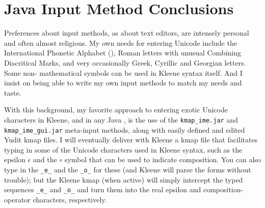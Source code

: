\section{Java Input Method Conclusions}

Preferences about input methods, as about text editors, are intensely
personal and often almost religious.  My own needs for entering Unicode
include the International Phonetic Alphabet (), Roman letters
with unusual Combining Diacritical Marks, and very occasionally Greek,
Cyrillic and Georgian letters.  Some non- mathematical
symbols can be used in Kleene syntax itself.  And I insist on being able
to write my own input methods to match my needs and taste.

With this background, my favorite approach to entering exotic Unicode
characters in Kleene, and in any Java , is the use of the
\texttt{kmap\_ime.jar} and \texttt{kmap\_ime\_gui.jar} meta-input
methods, along with easily defined and edited Yudit kmap files.  I will
eventually deliver with Kleene a kmap file that facilitates typing in
some of the Unicode characters used in Kleene syntax, such as the epsilon
$\epsilon$ and the $\circ$ symbol that can be used to indicate
composition.  You can also type in the  \verb!_e_! and the
\verb!_o_! for these (and Kleene will parse the  forms
without trouble); but the Kleene kmap (when active) will simply intercept
the typed sequences \verb!_e_! and \verb!_o_! and turn them into the real
epsilon and composition-operator characters, respectively.
 

